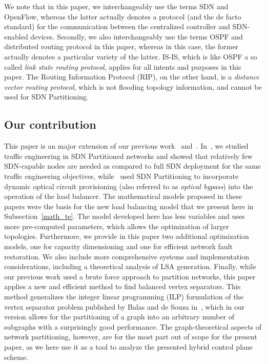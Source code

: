 \documentclass[journal]{IEEEtran}
\begin{document}
\par We note that in this paper, we interchangeably use the terms SDN and OpenFlow, whereas the latter actually denotes a protocol (and the de facto standard) for the communication between the centralized controller and SDN-enabled devices. Secondly, we also interchangeably use the terms OSPF and distributed routing protocol in this paper, whereas in this case, the former actually denotes a particular variety of the latter. IS-IS, which is like OSPF a so called \emph{link state routing protocol}, applies for all intents and purposes in this paper. The Routing Information Protocol (RIP), on the other hand, is a \emph{distance vector routing protocol}, which is not flooding topology information, and cannot be used for SDN Partitioning. 


\subsection*{Our contribution}
This paper is an major extension of our previous work~\cite{divideandconquer} and~\cite{caria_HPSR}. In~\cite{divideandconquer}, we studied traffic engineering in SDN Partitioned networks and showed that relatively few SDN-capable nodes are needed as compared to full SDN deployment for the same traffic engineering objectives, while~\cite{caria_HPSR} used SDN Partitioning to incorporate dynamic optical circuit provisioning (also referred to as \emph{optical bypass}) into the operation of the load balancer. The mathematical models proposed in these papers were the basis for the new load balancing model that we present here in Subsection~\ref{math_te}. The model developed here has less variables and uses more pre-computed parameters, which allows the optimization of larger topologies. Furthermore, we provide in this paper two additional optimization models, one for capacity dimensioning and one for efficient network fault restoration. We also include more comprehensive systems and implementation considerations, including a theoretical analysis of LSA generation. Finally, while our previous work used a brute force approach to partition networks, this paper applies a new and efficient method to find balanced vertex separators. This method generalizes the integer linear programming (ILP) formulation of the vertex separator problem published by Balas and de Souza in~\cite{Souza}, which in our version allows for the partitioning of a graph into an arbitrary number of subgraphs with a surprisingly good performance. The graph-theoretical aspects of network partitioning, however, are for the most part out of scope for the present paper, as we here use it as a tool to analyze the presented hybrid control plane scheme.
\end{document}
